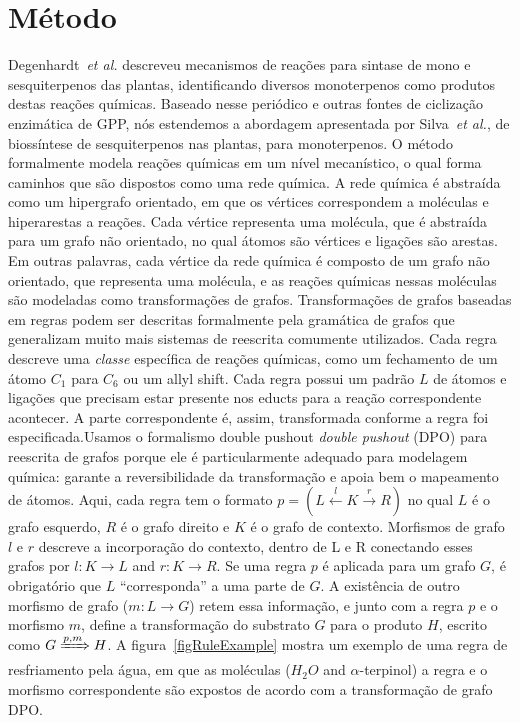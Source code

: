 \chapter{Método}
\label{Metodo}
\indent
Degenhardt~\textit{et al.} descreveu mecanismos de reações para sintase de mono e sesquiterpenos das plantas, identificando diversos monoterpenos como produtos destas reações químicas. Baseado nesse periódico e outras fontes de ciclização enzimática de GPP, nós estendemos a abordagem apresentada por Silva~\textit{et al.}, de biossíntese de sesquiterpenos nas plantas, para monoterpenos.
O método formalmente modela reações químicas em um nível mecanístico, o qual forma caminhos que são dispostos como uma rede química. A rede química é abstraída como um hipergrafo orientado, em que os vértices correspondem a moléculas  e  hiperarestas a reações. Cada vértice representa uma molécula, que é abstraída para um grafo não orientado, no qual átomos são vértices e ligações são arestas. Em outras palavras, cada vértice da rede química é composto de um grafo não orientado, que representa uma molécula, e as reações químicas nessas moléculas são modeladas como transformações de grafos. 
Transformações de grafos baseadas em regras podem ser descritas formalmente pela gramática de grafos que generalizam muito mais sistemas de reescrita comumente utilizados. Cada regra descreve uma \emph{classe}  específica de reações químicas, como um fechamento de um átomo $C_1$ para $C_6$ ou um allyl shift. Cada regra possui um padrão $L$ de átomos e ligações que precisam estar presente nos educts para a reação correspondente acontecer. A parte correspondente é, assim, transformada conforme a regra foi especificada.Usamos o formalismo double pushout \emph{double pushout} (DPO) para reescrita de grafos porque ele é particularmente adequado para modelagem química: garante a reversibilidade da transformação e apoia bem o mapeamento de átomos. Aqui, cada regra tem o formato $p = (L \xleftarrow{l} K \xrightarrow{r} R)$  no qual $L$ é o grafo esquerdo, $R$ é o grafo direito e $K$ é o grafo de contexto. Morfismos de grafo $l$ e $r$ descreve a incorporação do contexto, dentro de L e R conectando esses grafos por $l\colon K\to L$ and $r\colon K\to R$.
Se uma regra $p$ é aplicada para um grafo $G$, é obrigatório  que $L$ “corresponda” a uma parte de $G$. A existência de outro morfismo de grafo ($m\colon L\to G$) retem essa informação, e junto com a regra $p$ e o morfismo $m$, define a transformação do substrato $G$ para o produto $H$, escrito como $G\xRightarrow{p,m}H$. A figura~\ref{figRuleExample} mostra um exemplo de uma regra de resfriamento pela água, em que as moléculas ($H_2O$ and $\alpha$-terpinol) a regra e o morfismo correspondente são expostos de acordo com a transformação de grafo DPO.

